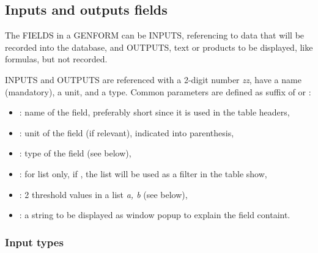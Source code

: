 \subsection{Inputs and outputs fields}

The FIELDS in a GENFORM can be INPUTS, referencing to data that will be recorded into the database, and OUTPUTS, text or products to be displayed, like formulas, but not recorded.

INPUTS and OUTPUTS are referenced with a 2-digit number {\it zz}, have a name (mandatory), a unit, and a type. Common parameters are defined as suffix of  or :
\begin{itemize}
	\item {}: name of the field, preferably short since it is used in the table headers,
	\item {}: unit of the field (if relevant), indicated into parenthesis,
	\item {}: type of the field (see below),
	\item {}: for list only, if , the list will be used as a filter in the table show,
	\item {}: 2 threshold values in a list {\it a, b} (see below),
	\item {}: a string to be displayed as window popup to explain the field containt.
\end{itemize}

\subsubsection{Input types}


